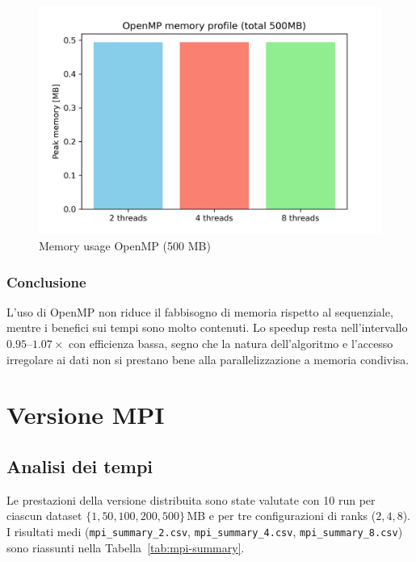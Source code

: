 				\begin{figure}[H]
						\centering
						\includegraphics[width=1\linewidth]{img/omp_plots/omp_memory.jpg}
						\caption{Memory usage OpenMP (500 MB)}
						\label{fig:omp_mem_usage}
				\end{figure}
			
			\subsubsection*{Conclusione}
				L’uso di OpenMP non riduce il fabbisogno di memoria rispetto al sequenziale, mentre i benefici sui tempi sono molto contenuti.
				Lo speedup resta nell’intervallo $0.95\text{--}1.07\times$ con efficienza bassa, segno che la natura dell’algoritmo e l’accesso irregolare ai dati non si prestano bene alla parallelizzazione a memoria condivisa.
	
	\section{Versione MPI}
		
		\subsection{Analisi dei tempi}
			Le prestazioni della versione distribuita sono state valutate con 10 run per ciascun dataset
			\(\{1, 50, 100, 200, 500\}\,\)MB e per tre configurazioni di ranks (\(2,4,8\)).
			I risultati medi (\texttt{mpi\_summary\_2.csv}, \texttt{mpi\_summary\_4.csv}, \texttt{mpi\_summary\_8.csv})
			sono riassunti nella Tabella~\ref{tab:mpi-summary}.
			

